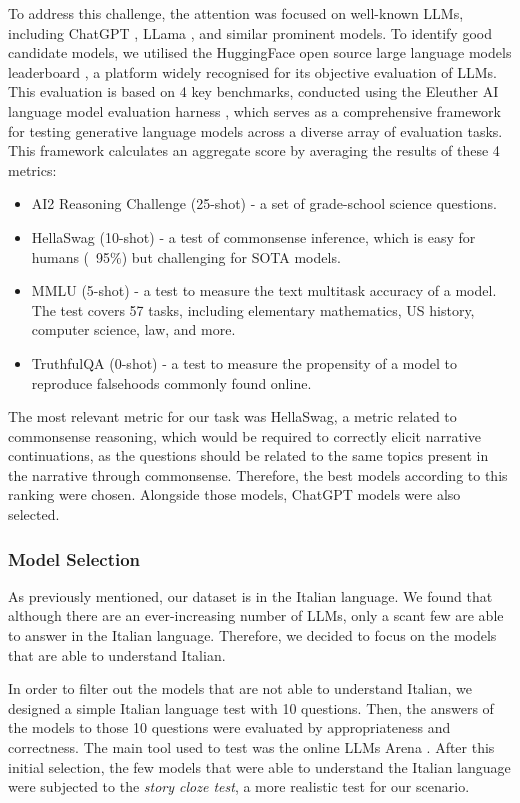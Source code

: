 To address this challenge, the attention was focused on well-known LLMs, including ChatGPT \cite{chatgpt}, LLama \cite{touvronllama}, and similar prominent models. To identify good candidate models, we utilised the HuggingFace open source large language models leaderboard \cite{huggingface-leaderboard}, a platform widely recognised for its objective evaluation of LLMs. This evaluation is based on 4 key benchmarks, conducted using the Eleuther AI language model evaluation harness \cite{eleuther}, which serves as a comprehensive framework for testing generative language models across a diverse array of evaluation tasks. This framework calculates an aggregate score by averaging the results of these 4 metrics:
\begin{itemize}
    \item {AI2 Reasoning Challenge (25-shot)} \cite{AI2} - a set of grade-school science questions.
    \item {HellaSwag (10-shot)} \cite{HellaSwag} - a test of commonsense inference, which is easy for humans (~95\%) but challenging for SOTA models.
    \item {MMLU (5-shot)} \cite{MMLU} - a test to measure the text multitask accuracy of a model. The test covers 57 tasks, including elementary mathematics, US history, computer science, law, and more.
    \item {TruthfulQA (0-shot)} \cite{Truthful} - a test to measure the propensity of a model to reproduce falsehoods commonly found online.
\end{itemize}
The most relevant metric for our task was HellaSwag, a metric related to commonsense reasoning, which would be required to correctly elicit narrative continuations, as the questions should be related to the same topics present in the narrative through commonsense. Therefore, the best models according to this ranking were chosen. Alongside those models, ChatGPT models were also selected. 

\subsubsection{Model Selection}
As previously mentioned, our dataset is in the Italian language. We found that although there are an ever-increasing number of LLMs, only a scant few are able to answer in the Italian language. Therefore, we decided to focus on the models that are able to understand Italian.

In order to filter out the models that are not able to understand Italian, we designed a simple Italian language test with 10 questions. Then, the answers of the models to those 10 questions were evaluated by appropriateness and correctness. The main tool used to test was the online LLMs Arena \cite{arena}. After this initial selection, the few models that were able to understand the Italian language were subjected to the \emph{story cloze test}, a more realistic test for our scenario.

